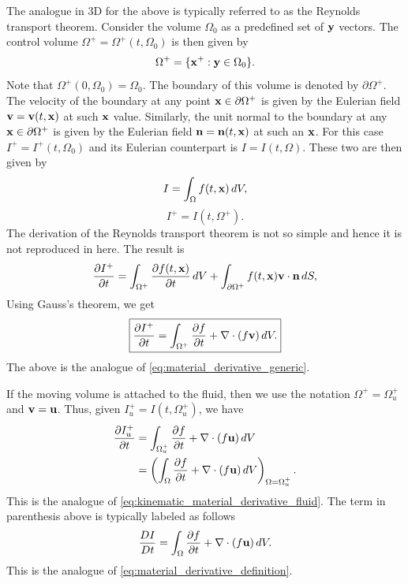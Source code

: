 \documentclass[oneside,a4paper,11pt]{report}
\begin{document}
The analogue in 3D for the above is typically referred to as the Reynolds transport theorem. Consider the volume $\Omega_0$ as a predefined set of $\mathbf{y}$ vectors. The control volume $\Omega^+ = \Omega^+(t, \Omega_0)$ is then given by
\begin{equation}
    \Omega^+ = \{ \mathbf{x}^+:\mathbf{y} \in \Omega_0 \}.
\end{equation}
Note that $\Omega^+(0,\Omega_0) = \Omega_0$. The boundary of this volume is denoted by $\partial \Omega^+$. The velocity of the boundary at any point $\mathbf{x} \in \partial \Omega^+$ is given by the Eulerian field $\mathbf{v} = \mathbf{v}(t,\mathbf{x})$ at such $\mathbf{x}$ value. Similarly, the unit normal to the boundary at any $\mathbf{x} \in \partial \Omega^+$ is given by the Eulerian field $\mathbf{n} = \mathbf{n}(t,\mathbf{x})$ at such an $\mathbf{x}$. For this case $I^+ = I^+(t,\Omega_0)$ and its Eulerian counterpart is $I = I(t,\Omega)$. These two are then given by
\begin{equation}
    I = \int_\Omega f(t,\mathbf{x}) \,dV,
\end{equation}
\begin{equation}
    I^+ = I(t,\Omega^+).
\end{equation}
The derivation of the Reynolds transport theorem is not so simple and hence it is not reproduced in here. The result is
\begin{equation}
  \frac{\partial I^+}{\partial t} = \int_{\Omega^+} \frac{\partial f(t,\mathbf{x})}{\partial t} \, dV + \int_{\partial \Omega^+} f(t,\mathbf{x}) \mathbf{v} \cdot \mathbf{n} \, dS,
\end{equation}
Using Gauss's theorem, we get
\begin{equation}
\label{eq:reynolds_transport_theorem_generic}
\boxed{
  \frac{\partial I^+}{\partial t} = \int_{\Omega^+} \frac{\partial f}{\partial t} + \nabla \cdot (f \mathbf{v} ) \, dV .
}
\end{equation}
The above is the analogue of \cref{eq:material_derivative_generic}. 

If the moving volume is attached to the fluid, then we use the notation $\Omega^+ = \Omega^+_u$ and $\mathbf{v} = \mathbf{u}$. Thus, given $I^+_u = I(t,\Omega^+_u)$, we have
\begin{align}
\label{eq:reynolds_transport_theorem_fluid}
  \frac{\partial I^+_u}{\partial t} &=  \int_{\Omega^+_u} \frac{\partial f}{\partial t} + \nabla \cdot ( f \mathbf{u} ) \, dV  \nonumber \\
  &=\left ( \int_{\Omega} \frac{\partial f}{\partial t} + \nabla \cdot ( f \mathbf{u} ) \, dV \right )_{\Omega = \Omega^+_u}.
\end{align}
This is the analogue of \cref{eq:kinematic_material_derivative_fluid}. The term in parenthesis above is typically labeled as follows
\begin{equation}
    \frac{DI}{Dt} = \int_{\Omega} \frac{\partial f}{\partial t} + \nabla \cdot ( f \mathbf{u} ) \, dV.
\end{equation}
This is the analogue of \cref{eq:material_derivative_definition}.
\end{document}
